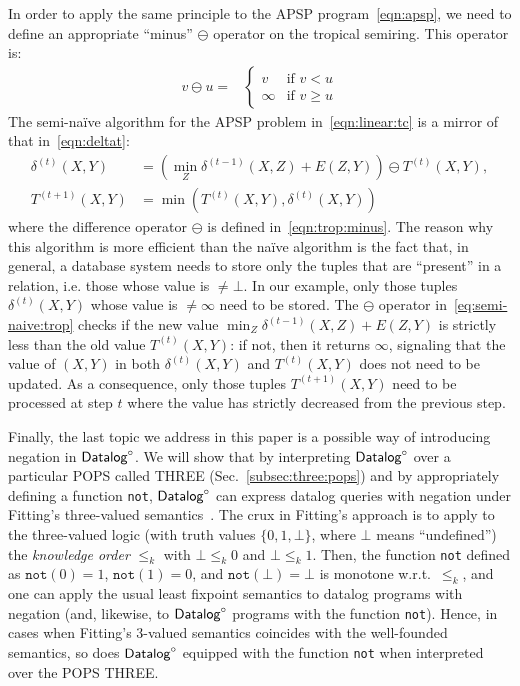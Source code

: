 In order to apply the same principle to the APSP
program~\eqref{eqn:apsp}, we need to define an appropriate ``minus''
$\ominus$ operator on the tropical semiring.  This operator is:
%
\begin{align}
  v\ominus u=&
        \begin{cases} v &\mbox{if } v < u\\
          \infty &\mbox{if } v \geq u
        \end{cases} \label{eqn:trop:minus}
\end{align}
%
The semi-na\"ive algorithm for the APSP problem in~\eqref{eqn:linear:tc}
is a mirror of that in~\eqref{eqn:deltat}:
%
\begin{align}
  \delta^{(t)}(X,Y) &= (\min_Z \delta^{(t-1)}(X,Z) + E(Z,Y)) \ominus T^{(t)}(X,Y), \label{eq:semi-naive:trop}\\
  T^{(t+1)}(X,Y) &= \min(T^{(t)}(X,Y), \delta^{(t)}(X,Y))\nonumber
\end{align}
%
where the difference operator $\ominus$ is defined
in~\eqref{eqn:trop:minus}. The reason why this algorithm is more
efficient than the na\"ive algorithm is the fact that, in general, a
database system needs to store only the tuples that are ``present'' in
a relation, i.e. those whose value is $\neq \bot$.  In our example,
only those tuples $\delta^{(t)}(X,Y)$ whose value is $\neq \infty$
need to be stored.  The $\ominus$ operator
in~\eqref{eq:semi-naive:trop} checks if the new value
$\min_Z \delta^{(t-1)}(X,Z) + E(Z,Y)$ is strictly less than the old
value $T^{(t)}(X,Y)$: if not, then it returns $\infty$, signaling that
the value of $(X,Y)$ in both $\delta^{(t)}(X,Y)$ and $T^{(t)}(X,Y)$
does not need to be updated.  As a consequence, only those tuples
$T^{(t+1)}(X,Y)$ need to be processed at step $t$ where the value has
strictly decreased from the previous step.



Finally, the last topic we address in this paper is a possible way of
introducing negation in $\text{\sf Datalog}^\circ$.  We will show that by interpreting
$\text{\sf Datalog}^\circ$ over a particular POPS called THREE
(Sec.~\ref{subsec:three:pops}) and by appropriately defining a
function \texttt{not}, $\text{\sf Datalog}^\circ$ can express datalog queries with
negation under Fitting's three-valued
semantics~\cite{DBLP:journals/jlp/Fitting85a}.  The crux in Fitting's
approach is to apply to the three-valued logic
(with truth values $\{0, 1,\bot\}$, where $\bot$ means ``undefined'')
the
{\em knowledge order} $\leq_k$ with $\bot \leq_k 0$ and
$\bot \leq_k 1$. Then, the function \texttt{not} defined as
$\mathtt{not}(0) = 1$, $\mathtt{not}(1) = 0$, and
$\mathtt{not}(\bot) = \bot$ is monotone w.r.t.\ $\leq_k$, and one can
apply the usual least fixpoint semantics to datalog programs with
negation (and, likewise, to $\text{\sf Datalog}^\circ$ programs with the function
\texttt{not}).  Hence, in cases when Fitting's 3-valued semantics
coincides with the well-founded semantics, so does $\text{\sf Datalog}^\circ$ equipped
with the function \texttt{not} when interpreted over the POPS THREE.

